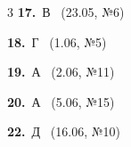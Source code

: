 \documentclass[12pt]{article}
\begin{document}
\ifshowsolutions
{}
\begin{multicols}{3}\noindent
\noindent\textbf{17.}~В \ {\scriptsize\color{gray}(23.05, №6)}\par
\noindent\textbf{18.}~Г \ {\scriptsize\color{gray}(1.06, №5)}\par
\noindent\textbf{19.}~А \ {\scriptsize\color{gray}(2.06, №11)}\par
\noindent\textbf{20.}~А \ {\scriptsize\color{gray}(5.06, №15)}\par
\noindent\textbf{22.}~Д \ {\scriptsize\color{gray}(16.06, №10)}\par
\end{multicols}
\fi

\endgroup
\end{document}
